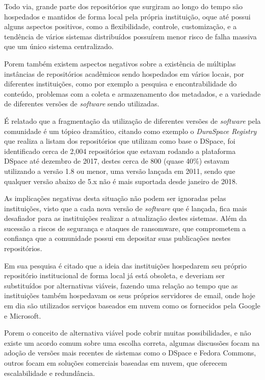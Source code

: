 Todo via, grande parte dos repositórios que surgiram ao longo do tempo são hospedados e
mantidos de forma local pela própria instituição, oque até possui alguns aspectos positivos,
como a flexibilidade, controle, customização, e a tendência de vários sistemas distribuídos
possuírem menor risco de falha massiva que um único sistema centralizado.

Porem também existem aspectos negativos sobre a existência de múltiplas instâncias
de repositórios acadêmicos sendo hospedados em vários locais, por diferentes
instituições, como por exemplo a pesquisa e encontrabilidade do conteúdo, problemas
com a coleta e armazenamento dos metadados, e a variedade de diferentes versões de
\emph{software} sendo utilizadas.

É relatado que a fragmentação da utilização de diferentes versões de \emph{software}
pela comunidade é um tópico dramático, citando como exemplo o \emph{DuraSpace Registry}
que realiza a listam dos repositórios que utilizam como base o DSpace, foi identificado
cerca de 2,004 repositórios que estavam rodando a plataforma DSpace até dezembro
de 2017, destes cerca de 800 (quase 40\%) estavam utilizando a versão 1.8 ou
menor, uma versão lançada em 2011, sendo que qualquer versão abaixo de 5.x não é
mais suportada desde janeiro de 2018.

As implicações negativas desta situação não podem ser ignoradas pelas instituições,
visto que a cada nova versão de \emph{software} que é lançada, fica mais desafiador
para as instituições realizar a atualização destes sistemas. Além da sucessão a
riscos de segurança e ataques de ransomware, que comprometem a confiança que a comunidade
possui em depositar suas publicações nestes repositórios.

Em sua pesquisa é citado que a ideia das instituições hospedarem seu próprio repositório
institucional de forma local já está obsoleta, e deveriam ser substituídos por alternativas viáveis,
fazendo uma relação ao tempo que as instituições também hospedavam os seus próprios servidores de
email, onde hoje em dia são utilizados serviços baseados em nuvem como os fornecidos pela
Google e Microsoft.

Porem o conceito de alternativa viável pode cobrir muitas possibilidades,
e não existe um acordo comum sobre uma escolha correta, algumas discussões focam na adoção de versões
mais recentes de sistemas como o DSpace e Fedora Commons, outros focam em soluções comerciais
baseadas em nuvem, que oferecem escalabilidade e redundância.

